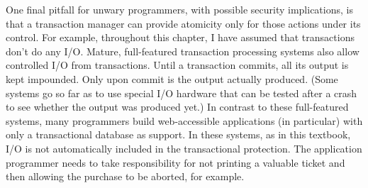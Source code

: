 One final pitfall for unwary programmers, with possible security
implications, is that a transaction manager can provide atomicity only 
for those actions under its control.  For example, throughout this
chapter, I have assumed that
transactions don't do any I/O.  Mature, full-featured transaction
processing systems also allow controlled I/O from transactions.  Until
a transaction commits, all its output is kept impounded.
Only upon commit is the output actually produced.  (Some systems go so
far as to use special I/O hardware that can be tested after a crash to
see whether the output was produced yet.)  In contrast to these
full-featured systems, many programmers build web-accessible
applications (in particular) with only a transactional database as
support.  In these systems, as in this textbook, I/O is not
automatically included in the transactional protection.  The
application programmer needs to take responsibility for not printing a
valuable ticket and then allowing the purchase to be aborted, for
example.

